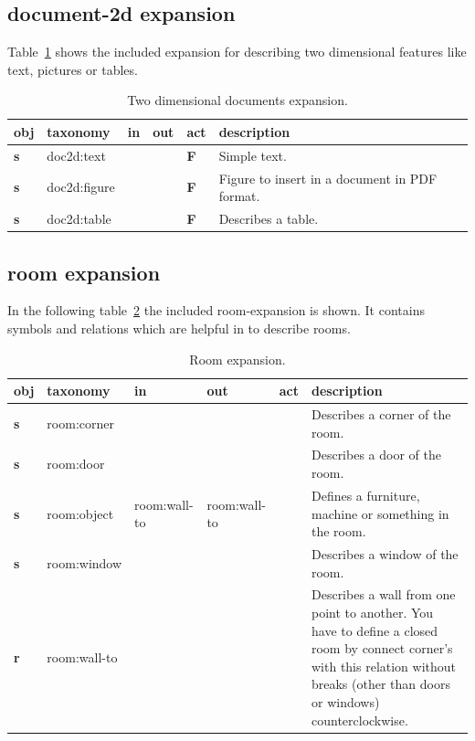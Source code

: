 \documentclass[a4paper, 12pt, openany]{scrbook}
\begin{document}
\subsection{document-2d expansion}
Table~\ref{tab:document-2d-expansion} shows the included expansion for describing two dimensional features like text, pictures or tables.
\begin{table}[htbp]
\centering
\begin{tabular}{|p{1cm}|p{3cm}|p{1.5cm}|p{1.5cm}|p{1cm}|p{7cm}|}
  \hline
  \textbf{obj} & \textbf{taxonomy} & \textbf{in} & \textbf{out} & \textbf{act} & \textbf{description} \\
  \hline
  \textbf{s} & doc2d:text & & & \textbf{F} & Simple text. \\
  \hline
  \textbf{s} & doc2d:figure & & & \textbf{F} & Figure to insert in a document in PDF format. \\
  \hline
  \textbf{s} & doc2d:table & & & \textbf{F} & Describes a table. \\
  \hline
\end{tabular}
\caption{Two dimensional documents expansion.}
\label{tab:document-2d-expansion}
\end{table}
\subsection{room expansion}
In the following table~\ref{tab:room-expansion} the included room-expansion is shown. It contains symbols and relations which are helpful in to describe rooms.
\begin{table}[htbp]
\centering
\begin{tabular}{|p{1cm}|p{3cm}|p{1.5cm}|p{1.5cm}|p{1cm}|p{7cm}|}
  \hline
  \textbf{obj} & \textbf{taxonomy} & \textbf{in} & \textbf{out} & \textbf{act} & \textbf{description} \\
  \hline
  \textbf{s} & room:corner & & & & Describes a corner of the room. \\
  \hline
  \textbf{s} & room:door & & & & Describes a door of the room. \\
  \hline
  \textbf{s} & room:object & room:\-wall-to & room:\-wall-to & & Defines a furniture, machine or something in the room. \\
  \hline
  \textbf{s} & room:window & & & & Describes a window of the room. \\
  \hline
  \textbf{r} & room:wall-to & & & & Describes a wall from one point to another. You have to define a closed room by connect corner's with this relation without breaks (other than doors or windows) counterclockwise. \\
  \hline
\end{tabular}
\caption{Room expansion.}
\label{tab:room-expansion}
\end{table}
\end{document}
